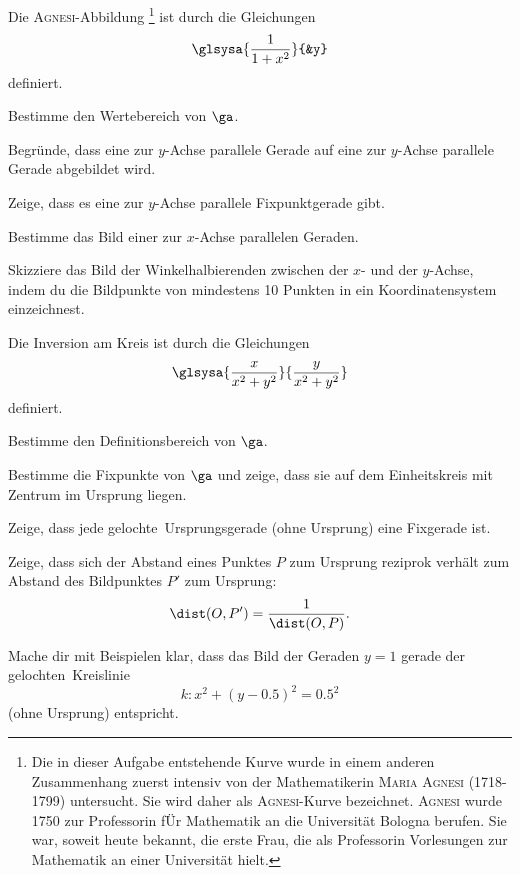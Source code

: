 \documentclass[%
11pt,%
twoside,%
titlepage,%
german,%
headsepline%
]{scrartcl}
\begin{document}
\begin{ueb}
Die \textsc{Agnesi}-Abbildung
\footnote{
Die in dieser Aufgabe entstehende Kurve wurde in einem anderen Zusammenhang zuerst intensiv von der Mathematikerin \textsc{Maria Agnesi} (1718-1799) untersucht. Sie wird daher als \textsc{Agnesi}-Kurve bezeichnet. \textsc{Agnesi} wurde 1750 zur Professorin f\"Ur Mathematik an die Universität Bologna berufen. Sie war, soweit heute bekannt, die erste Frau, die als Professorin Vorlesungen zur Mathematik an einer Universität hielt.
}
ist durch die Gleichungen
$$\glsysa{\frac{1}{1+x^2}}{&y}$$
definiert.
\begin{enumeratea}
\item Bestimme den Wertebereich von $\ga$.
\item Begr\"unde, dass eine zur $y$-Achse parallele Gerade auf eine zur $y$-Achse parallele Gerade abgebildet wird.
\item Zeige, dass es eine zur $y$-Achse parallele Fixpunktgerade gibt.
\item Bestimme das Bild einer zur $x$-Achse parallelen Geraden.
\item Skizziere das Bild der Winkelhalbierenden zwischen der $x$- und der $y$-Achse, indem du die Bildpunkte von mindestens 10 Punkten in ein Koordinatensystem einzeichnest.
\end{enumeratea}
\end{ueb}

\begin{ueb}
Die Inversion am Kreis ist durch die Gleichungen
$$\glsysa{\frac{x}{x^2+y^2}}{\frac{y}{x^2+y^2}}$$
definiert.
\begin{enumeratea}
\item Bestimme den Definitionsbereich von $\ga$.
\item Bestimme die Fixpunkte von $\ga$ und zeige, dass sie auf dem Einheitskreis mit Zentrum im Ursprung liegen.
\item Zeige, dass jede \glqq gelochte\grqq\ Ursprungsgerade (ohne Ursprung) eine Fixgerade ist.
\item Zeige, dass sich der Abstand eines Punktes $P$ zum Ursprung reziprok verhält zum Abstand des Bildpunktes $P'$ zum Ursprung:
$$\dist(O,P')=\frac{1}{\dist(O,P)}.$$
\item Mache dir mit Beispielen klar, dass das Bild der Geraden $y = 1$ gerade der \glqq gelochten\grqq\ Kreislinie
$$k : x^2 + (y-0.5)^2 = 0.5^2$$
(ohne Ursprung) entspricht.
\end{enumeratea}
\end{ueb}
\end{document}
